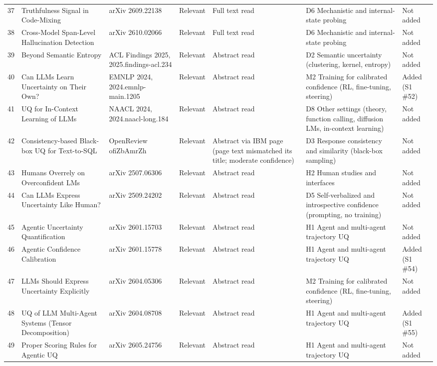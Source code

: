 \documentclass[acmsmall]{acmart}
\begin{document}
\begin{center}
\begin{longtable}{@{}r p{3.0cm} p{2.0cm} p{1.5cm} p{2.3cm} p{2.6cm} p{1.2cm}@{}}
37 & Truthfulness Signal in Code-Mixing & arXiv 2609.22138 & Relevant & Full text read & D6 Mechanistic and internal-state probing & Not added \\
38 & Cross-Model Span-Level Hallucination Detection & arXiv 2610.02066 & Relevant & Full text read & D6 Mechanistic and internal-state probing & Not added \\
39 & Beyond Semantic Entropy & ACL Findings 2025, 2025.findings-acl.234 & Relevant & Abstract read & D2 Semantic uncertainty (clustering, kernel, entropy) & Not added \\
40 & Can LLMs Learn Uncertainty on Their Own? & EMNLP 2024, 2024.emnlp-main.1205 & Relevant & Abstract read & M2 Training for calibrated confidence (RL, fine-tuning, steering) & Added (S1 \#52) \\
41 & UQ for In-Context Learning of LLMs & NAACL 2024, 2024.naacl-long.184 & Relevant & Abstract read & D8 Other settings (theory, function calling, diffusion LMs, in-context learning) & Not added \\
42 & Consistency-based Black-box UQ for Text-to-SQL & OpenReview ofiZbAmrZh & Relevant & Abstract via IBM page (page text mismatched its title; moderate confidence) & D3 Response consistency and similarity (black-box sampling) & Not added \\
43 & Humans Overrely on Overconfident LMs & arXiv 2507.06306 & Relevant & Abstract read & H2 Human studies and interfaces & Not added \\
44 & Can LLMs Express Uncertainty Like Human? & arXiv 2509.24202 & Relevant & Abstract read & D5 Self-verbalized and introspective confidence (prompting, no training) & Not added \\
45 & Agentic Uncertainty Quantification & arXiv 2601.15703 & Relevant & Abstract read & H1 Agent and multi-agent trajectory UQ & Not added \\
46 & Agentic Confidence Calibration & arXiv 2601.15778 & Relevant & Abstract read & H1 Agent and multi-agent trajectory UQ & Added (S1 \#54) \\
47 & LLMs Should Express Uncertainty Explicitly & arXiv 2604.05306 & Relevant & Abstract read & M2 Training for calibrated confidence (RL, fine-tuning, steering) & Not added \\
48 & UQ of LLM Multi-Agent Systems (Tensor Decomposition) & arXiv 2604.08708 & Relevant & Abstract read & H1 Agent and multi-agent trajectory UQ & Added (S1 \#55) \\
49 & Proper Scoring Rules for Agentic UQ & arXiv 2605.24756 & Relevant & Abstract read & H1 Agent and multi-agent trajectory UQ & Not added \\

\end{longtable}
\end{center}
\end{document}
